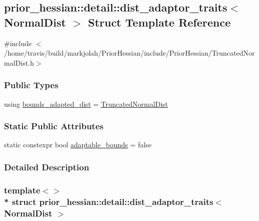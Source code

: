 \hypertarget{structprior__hessian_1_1detail_1_1dist__adaptor__traits_3_01NormalDist_01_4}{}\subsection{prior\+\_\+hessian\+:\+:detail\+:\+:dist\+\_\+adaptor\+\_\+traits$<$ Normal\+Dist $>$ Struct Template Reference}
\label{structprior__hessian_1_1detail_1_1dist__adaptor__traits_3_01NormalDist_01_4}


{\ttfamily \#include $<$/home/travis/build/markjolah/\+Prior\+Hessian/include/\+Prior\+Hessian/\+Truncated\+Normal\+Dist.\+h$>$}

\subsubsection*{Public Types}
\begin{DoxyCompactItemize}
\item 
using \hyperlink{structprior__hessian_1_1detail_1_1dist__adaptor__traits_3_01NormalDist_01_4_a9ad536301ab3f3f186375df1c028f969}{bounds\+\_\+adapted\+\_\+dist} = \hyperlink{namespaceprior__hessian_a47f38d4bb5d31fd3f01f5eb6ba6f1223}{Truncated\+Normal\+Dist}
\end{DoxyCompactItemize}
\subsubsection*{Static Public Attributes}
\begin{DoxyCompactItemize}
\item 
static constexpr bool \hyperlink{structprior__hessian_1_1detail_1_1dist__adaptor__traits_3_01NormalDist_01_4_a9ffe6b9190c25f3449fd3378bf21be66}{adaptable\+\_\+bounds} = false
\end{DoxyCompactItemize}


\subsubsection{Detailed Description}
\subsubsection*{template$<$$>$\\*
struct prior\+\_\+hessian\+::detail\+::dist\+\_\+adaptor\+\_\+traits$<$ Normal\+Dist $>$}




